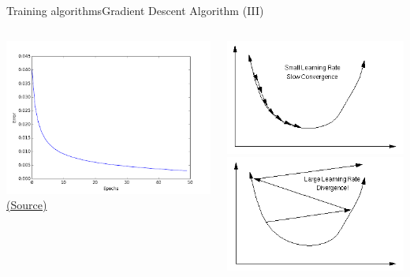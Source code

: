 \documentclass[10pt,compress]{beamer} %
\begin{document}
\begin{frame}{Training algorithms}{Gradient Descent Algorithm (III)}
	\begin{columns}
	\begin{center}
	\includegraphics[width=\linewidth]{figs/nn_learncurve.png}\\
	\scriptsize \href{http://sujitpal.blogspot.com.es/2014/07/handwritten-digit-recognition-with.html}{(Source)}
	\end{center}
	\vspace{-0.5cm}
	\begin{center}
	\includegraphics[width=0.8\linewidth]{figs/nn_learning.png}\\
	\includegraphics[width=0.8\linewidth]{figs/nn_learning2.png}\\

\end{center}
\end{columns}
\end{frame}
\end{document}
